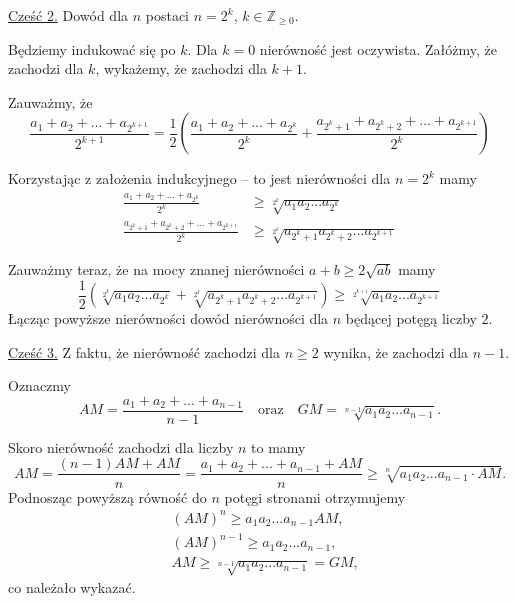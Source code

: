 \noindent
\underline{Cześć 2.} Dowód dla $n$ postaci $n = 2^k$, $k \in \mathbb{Z}_{\geqslant 0}$.

\vspace{10px}

\noindent
Będziemy indukować się po $k$. Dla $k = 0$ nierówność jest oczywista. Załóżmy, że zachodzi dla $k$, wykażemy, że zachodzi dla $k + 1$.

\noindent
Zauważmy, że
\[
    \frac{a_1 + a_2 + ... + a_{2^{k + 1}}}{2^{k + 1}} = \frac{1}{2}\left( \frac{a_1 + a_2 + ... + a_{2^{k}}}{2^{k}} + \frac{a_{2^k + 1} + a_{2^k + 2} + ... + a_{2^{k + 1}}}{2^{k}}\right)
\]

\noindent
Korzystając z założenia indukcyjnego -- to jest nierówności dla $n = 2^{k}$ mamy
\begin{align*}
    \frac{a_1 + a_2 + ... + a_{2^{k}}}{2^{k}} &\geqslant \sqrt[2^k]{a_1a_2...a_{2^k}} \\
   \frac{a_{2^k + 1} + a_{2^k + 2} + ... + a_{2^{k + 1}}}{2^{k}} &\geqslant \sqrt[2^k]{a_{2^k + 1}a_{2^k + 2}...a_{2^{k + 1}}}
\end{align*}

\noindent
Zauważmy teraz, że na mocy znanej nierówności $a + b \geqslant 2\sqrt{ab}$ mamy
\[
    \frac{1}{2}\left(\sqrt[2^k]{a_1a_2...a_{2^k}} + \sqrt[2^k]{a_{2^k + 1}a_{2^k + 2}...a_{2^{k + 1}}}\right) \geqslant \sqrt[2^{k + 1}]{a_1a_2...a_{2^{k + 1}}}
\]
Łącząc powyższe nierówności dowód nierówności dla $n$ będącej potęgą liczby $2$.

\vspace{10px}

\noindent
\underline{Cześć 3.} Z faktu, że nierówność zachodzi dla $n \geqslant 2$ wynika, że zachodzi dla $n - 1$.

\vspace{10px}

\noindent
Oznaczmy 
\[
    AM = \frac{a_1 + a_2 + ... + a_{n - 1}}{n - 1} \quad \text{oraz} \quad GM = \sqrt[n - 1]{a_1a_2...a_{n - 1}}.
\]

\noindent
Skoro nierówność zachodzi dla liczby $n$ to mamy
\[
    AM = \frac{(n-1)AM + AM}{n} = \frac{a_1 + a_2 + ... + a_{n - 1} + AM}{n} \geqslant \sqrt[n]{a_1a_2...a_{n - 1}\cdot AM}.
\]
Podnosząc powyższą równość do $n$ potęgi stronami otrzymujemy
\begin{align*}
    &(AM)^n \geqslant a_1a_2...a_{n-1}AM, \\
    &(AM)^{n - 1} \geqslant a_1a_2...a_{n-1}, \\
    &AM \geqslant \sqrt[n - 1]{a_1a_2...a_{n-1}} = GM,
\end{align*}
co należało wykazać.

